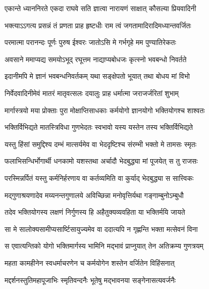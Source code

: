 

\addtocounter{shlokacount}{52}

\twolineshloka
{एकान्ते ध्याननिरते एकदा राघवे सति}
{ज्ञात्वा नारायणं साक्षात् कौसल्या प्रियवादिनी} %

\twolineshloka
{भक्त्याऽऽगत्य प्रसन्नं तं प्रणता प्राह हृष्टधीः}
{राम त्वं जगतामादिरादिमध्यान्तवर्जितः} %

\twolineshloka
{परमात्मा परानन्दः पूर्णः पुरुष ईश्वरः}
{जातोऽसि मे गर्भगृहे मम पुण्यातिरेकतः} %

\twolineshloka
{अवसाने ममाप्यद्य समयोऽभूद् रघूत्तम}
{नाद्याप्यबोधजः कृत्स्नो भवबन्धो निवर्तते} %

\twolineshloka
{इदानीमपि मे ज्ञानं भवबन्धनिवर्तकम्}
{यथा सङ्क्षेपतो भूयात् तथा बोधय मां विभो} %

\twolineshloka
{निर्वेदवादिनीमेवं मातरं मातृवत्सलः}
{दयालुः प्राह धर्मात्मा जराजर्जरितां शुभाम्} %

\twolineshloka
{मार्गास्त्रयो मया प्रोक्ताः पुरा मोक्षाप्तिसाधकाः}
{कर्मयोगो ज्ञानयोगो भक्तियोगश्च शाश्वतः} %

\twolineshloka
{भक्तिर्विभिद्यते मातस्त्रिविधा गुणभेदतः}
{स्वभावो यस्य यस्तेन तस्य भक्तिर्विभिद्यते} %

\twolineshloka
{यस्तु हिंसां समुद्दिश्य दम्भं मात्सर्यमेव वा}
{भेददृष्टिश्च संरम्भी भक्तो मे तामसः स्मृतः} %

\twolineshloka
{फलाभिसन्धिर्भोगार्थी धनकामो यशस्तथा}
{अर्चादौ भेदबुद्ध्या मां पूजयेत् स तु राजसः} %

\twolineshloka
{परस्मिन्नर्पितं यस्तु कर्मनिर्हरणाय वा}
{कर्तव्यमिति वा कुर्याद् भेदबुद्ध्या स सात्त्विकः} %

\twolineshloka
{मद्गुणाश्रयणादेव मय्यनन्तगुणालये}
{अविच्छिन्ना मनोवृत्तिर्यथा गङ्गाम्बुनोऽम्बुधौ} %

\twolineshloka
{तदेव भक्तियोगस्य लक्षणं निर्गुणस्य हि}
{अहैतुक्यव्यवहिता या भक्तिर्मयि जायते} %

\twolineshloka
{सा मे सालोक्यसामीप्यसार्ष्टिसायुज्यमेव वा}
{ददात्यपि न गृह्णन्ति भक्ता मत्सेवनं विना} %

\twolineshloka
{स एवात्यन्तिको योगो भक्तिमार्गस्य भामिनि}
{मद्भावं प्राप्नुयात् तेन अतिक्रम्य गुणत्रयम्} %

\twolineshloka
{महता कामहीनेन स्वधर्माचरणेन च}
{कर्मयोगेन शस्तेन वर्जितेन विहिंसनात्} %

\twolineshloka
{मद्दर्शनस्तुतिमहापूजाभिः स्मृतिवन्दनैः}
{भूतेषु मद्भावनया सङ्गेनासत्यवर्जनैः} %

